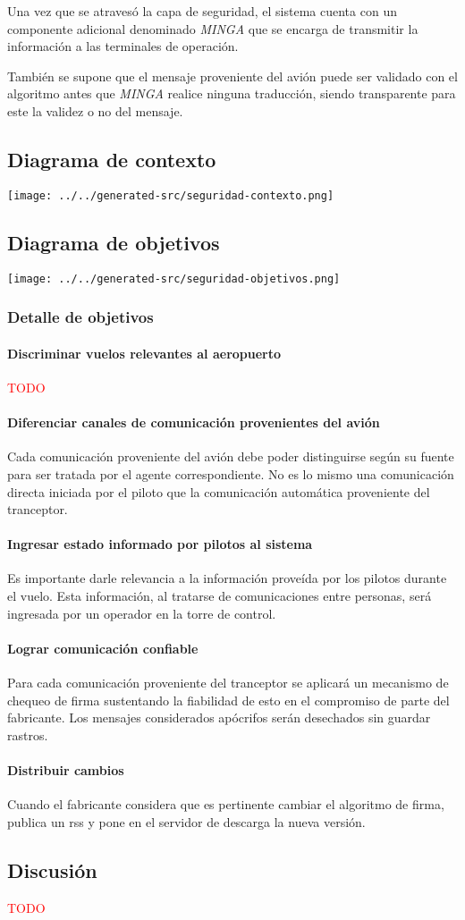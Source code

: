 Una vez que se atravesó la capa de seguridad, el sistema cuenta con un componente adicional denominado \emph{MINGA} que se encarga de transmitir la información a las terminales de operación.

También se supone que el mensaje proveniente del avión puede ser validado con el algoritmo antes que \emph{MINGA} realice ninguna traducción, siendo transparente para este la validez o no del mensaje.

\subsection{Diagrama de contexto}
\texttt{[image: ../../generated-src/seguridad-contexto.png]}

\subsection{Diagrama de objetivos}
\texttt{[image: ../../generated-src/seguridad-objetivos.png]}

\subsubsection{Detalle de objetivos}
\paragraph{Discriminar vuelos relevantes al aeropuerto}
\textcolor{red}{TODO}
\paragraph{Diferenciar canales de comunicación provenientes del avión}
Cada comunicación proveniente del avión debe poder distinguirse según su fuente para ser tratada por el agente correspondiente. No es lo mismo una comunicación directa iniciada por el piloto que la comunicación automática proveniente del tranceptor.
\paragraph{Ingresar estado informado por pilotos al sistema}
Es importante darle relevancia a la información proveída por los pilotos durante el vuelo. Esta información, al tratarse de comunicaciones entre personas, será ingresada por un operador en la torre de control.
\paragraph{Lograr comunicación confiable}
Para cada comunicación proveniente del tranceptor se aplicará un mecanismo de chequeo de firma sustentando la fiabilidad de esto en el compromiso de parte del fabricante. Los mensajes considerados apócrifos serán desechados sin guardar rastros.
\paragraph{Distribuir cambios}
Cuando el fabricante considera que es pertinente cambiar el algoritmo de firma, publica un rss y pone en el servidor de descarga la nueva versión.

\subsection{Discusión}
\textcolor{red}{TODO}
